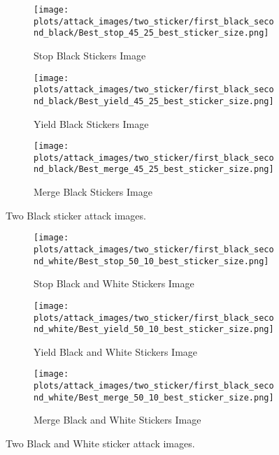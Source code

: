 \begin{figure*}[t]
    \begin{subfigure}[b]{0.25\textwidth}
        \centering
\texttt{[image: plots/attack\_images/two\_sticker/first\_black\_second\_black/Best\_stop\_45\_25\_best\_sticker\_size.png]}
        \caption{\small \centering Stop Black Stickers Image}
        \label{fig:Best_stop_black_black_two_sticker}
    \end{subfigure}
    \hfill
    \begin{subfigure}[b]{0.25\textwidth}
        \centering
         \texttt{[image: plots/attack\_images/two\_sticker/first\_black\_second\_black/Best\_yield\_45\_25\_best\_sticker\_size.png]}
        \caption{\small \centering Yield Black Stickers Image}
        \label{fig:Best_yield_black_black_two_sticker}
    \end{subfigure}
    \hfill
    \begin{subfigure}[b]{0.25\textwidth}
        \centering
  \texttt{[image: plots/attack\_images/two\_sticker/first\_black\_second\_black/Best\_merge\_45\_25\_best\_sticker\_size.png]}
        \caption{\small \centering Merge Black Stickers Image}
        \label{fig:Best_merge_black_black_two_sticker}
    \end{subfigure}
    \vspace{-1em}
    \caption{Two Black sticker attack images.}
    \label{fig:two_sticker_black_black_Images}
\end{figure*}



\begin{figure*}[t]
    \begin{subfigure}[b]{0.25\textwidth}
        \centering
\texttt{[image: plots/attack\_images/two\_sticker/first\_black\_second\_white/Best\_stop\_50\_10\_best\_sticker\_size.png]}
        \caption{\small \centering Stop Black and White Stickers Image}
        \label{fig:Best_stop_black_white_two_sticker}
    \end{subfigure}
    \hfill
    \begin{subfigure}[b]{0.25\textwidth}
        \centering
         \texttt{[image: plots/attack\_images/two\_sticker/first\_black\_second\_white/Best\_yield\_50\_10\_best\_sticker\_size.png]}
        \caption{\small \centering Yield Black and White Stickers Image}
        \label{fig:Best_yield_black_white_two_sticker}
    \end{subfigure}
    \hfill
    \begin{subfigure}[b]{0.25\textwidth}
        \centering
  \texttt{[image: plots/attack\_images/two\_sticker/first\_black\_second\_white/Best\_merge\_50\_10\_best\_sticker\_size.png]}
        \caption{\small \centering Merge Black and White Stickers Image}
        \label{fig:Best_merge_black_white_two_sticker}
    \end{subfigure}
    \vspace{-1em}
    \caption{Two Black and White sticker attack images.}
    \label{fig:two_sticker_black_white_Images}
\end{figure*}


